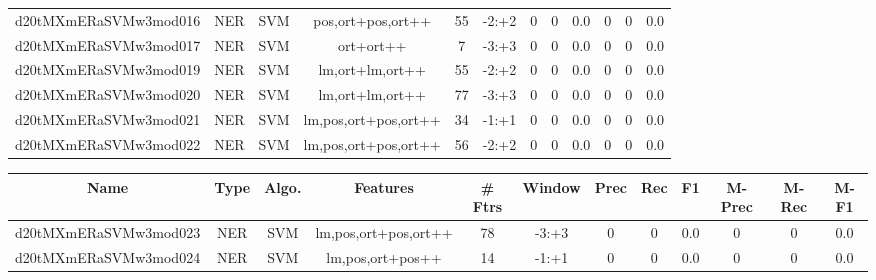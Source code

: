 \documentclass[a4paper]{article}
\begin{document}
\begin{landscape}
\begin{center}
\begin{tabular}{ |c|c|c|c|c|c|c|c|c|c|c|c|}
 
 	
 	\small{ d20tMXmERaSVMw3mod016 } & \small{ NER} & \small{  SVM }  & pos,ort+pos,ort++  &  55 &  \small{  -2:+2 }  &  0 & 0 & 0.0  &  0 & 0 & 0.0 \\
 	

 
 	
 	\small{ d20tMXmERaSVMw3mod017 } & \small{ NER} & \small{  SVM }  & ort+ort++  &  7 &  \small{  -3:+3 }  &  0 & 0 & 0.0  &  0 & 0 & 0.0 \\
 	

 
 	
 	\small{ d20tMXmERaSVMw3mod019 } & \small{ NER} & \small{  SVM }  & lm,ort+lm,ort++  &  55 &  \small{  -2:+2 }  &  0 & 0 & 0.0  &  0 & 0 & 0.0 \\
 	

 
 	
 	\small{ d20tMXmERaSVMw3mod020 } & \small{ NER} & \small{  SVM }  & lm,ort+lm,ort++  &  77 &  \small{  -3:+3 }  &  0 & 0 & 0.0  &  0 & 0 & 0.0 \\
 	

 
 	
 	\small{ d20tMXmERaSVMw3mod021 } & \small{ NER} & \small{  SVM }  & lm,pos,ort+pos,ort++  &  34 &  \small{  -1:+1 }  &  0 & 0 & 0.0  &  0 & 0 & 0.0 \\
 	

 
 	
 	\small{ d20tMXmERaSVMw3mod022 } & \small{ NER} & \small{  SVM }  & lm,pos,ort+pos,ort++  &  56 &  \small{  -2:+2 }  &  0 & 0 & 0.0  &  0 & 0 & 0.0 \\
 	
 \hline
\end{tabular}
\end{center}




\begin{center}
\begin{tabular}{ |c|c|c|c|c|c|c|c|c|c|c|c|} 
 \hline
 	Name & Type & Algo. & Features & \# Ftrs & Window & Prec & Rec & F1 & M-Prec & M-Rec & M-F1\\
 \hline

 	

 
 	
 	\small{ d20tMXmERaSVMw3mod023 } & \small{ NER} & \small{  SVM }  & lm,pos,ort+pos,ort++  &  78 &  \small{  -3:+3 }  &  0 & 0 & 0.0  &  0 & 0 & 0.0 \\
 	

 
 	
 	\small{ d20tMXmERaSVMw3mod024 } & \small{ NER} & \small{  SVM }  & lm,pos,ort+pos++  &  14 &  \small{  -1:+1 }  &  0 & 0 & 0.0  &  0 & 0 & 0.0 \\
 	


\end{tabular}
\end{center}
\end{landscape}
\end{document}
